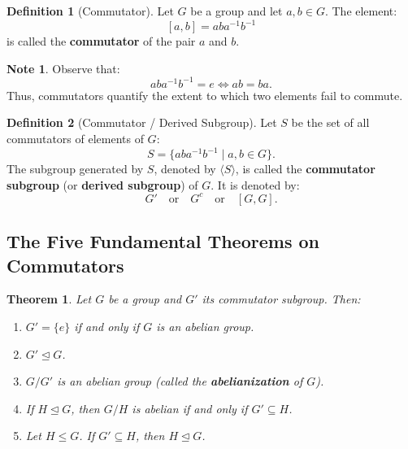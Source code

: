 \documentclass[12pt]{article}
\theoremstyle{definition}
\newtheorem{definition}{Definition}[section]
\newtheorem*{note}{Note}
\theoremstyle{plain}
\newtheorem{theorem}{Theorem}[section]
\begin{document}
\begin{definition}[Commutator]
Let $G$ be a group and let $a, b \in G$. The element:
\[
[a, b] = a b a^{-1} b^{-1}
\]
is called the \textbf{commutator} of the pair $a$ and $b$.
\end{definition}

\begin{note}
Observe that:
\[
a b a^{-1} b^{-1} = e \iff a b = b a.
\]
Thus, commutators quantify the extent to which two elements fail to commute.
\end{note}

\begin{definition}[Commutator / Derived Subgroup]
Let $S$ be the set of all commutators of elements of $G$:
\[
S = \{ a b a^{-1} b^{-1} \mid a, b \in G \}.
\]
The subgroup generated by $S$, denoted by $\langle S \rangle$, is called the \textbf{commutator subgroup} (or \textbf{derived subgroup}) of $G$.
It is denoted by:
\[
G' \quad \text{or} \quad G^c \quad \text{or} \quad [G, G].
\]
\end{definition}

\subsection{The Five Fundamental Theorems on Commutators}

\begin{theorem}
Let $G$ be a group and $G'$ its commutator subgroup. Then:
\begin{enumerate}
    \item $G' = \{e\}$ if and only if $G$ is an abelian group.
    \item $G' \trianglelefteq G$.
    \item $G/G'$ is an abelian group (called the \textbf{abelianization} of $G$).
    \item If $H \trianglelefteq G$, then $G/H$ is abelian if and only if $G' \subseteq H$.
    \item Let $H \le G$. If $G' \subseteq H$, then $H \trianglelefteq G$.
\end{enumerate}
\end{theorem}
\end{document}
